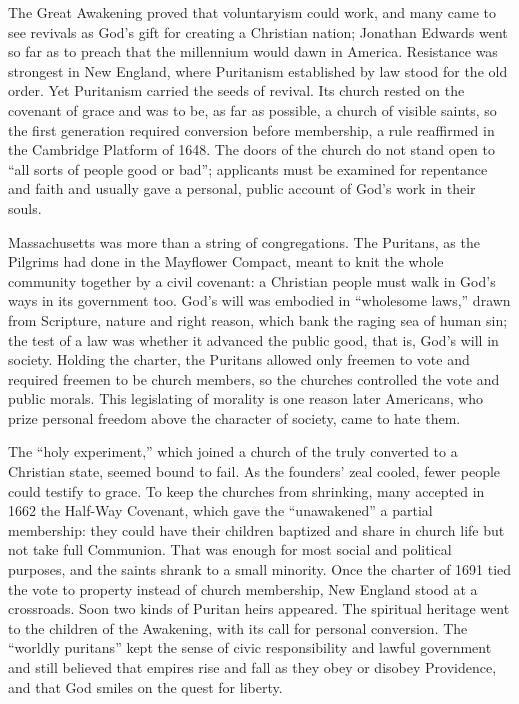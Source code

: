 The Great Awakening proved that voluntaryism could work, and many came to see revivals as God's gift
for creating a Christian nation; Jonathan Edwards went so far as to preach that the millennium would dawn in America. Resistance was strongest in New England, where Puritanism established by law stood
for the old order. Yet Puritanism carried the seeds of revival. Its church rested on the covenant of
grace and was to be, as far as possible, a church of visible saints, so the first generation required
conversion before membership, a rule reaffirmed in the Cambridge Platform of 1648. The doors of the
church do not stand open to ``all sorts of people good or bad''; applicants must be examined for
repentance and faith and usually gave a personal, public account of God's work in their souls.

Massachusetts was more than a string of congregations. The Puritans, as the Pilgrims had done in the Mayflower Compact, meant to knit the whole community together by a civil covenant: a Christian people must
walk in God's ways in its government too. God's will was embodied in ``wholesome laws,'' drawn from
Scripture, nature and right reason, which bank the raging sea of human sin; the test of a law was
whether it advanced the public good, that is, God's will in society. Holding the charter, the
Puritans allowed only freemen to vote and required freemen to be church members, so the churches
controlled the vote and public morals. This legislating of morality is one reason later Americans,
who prize personal freedom above the character of society, came to hate them.

The ``holy experiment,'' which joined a church of the truly converted to a Christian state, seemed
bound to fail. As the founders' zeal cooled, fewer people could testify to grace. To keep the
churches from shrinking, many accepted in 1662 the Half-Way Covenant, which gave the ``unawakened'' a
partial membership: they could have their children baptized and share in church life but not take
full Communion. That was enough for most social and political purposes, and the saints shrank to a
small minority. Once the charter of 1691 tied the vote to property instead of church membership,
New England stood at a crossroads. Soon two kinds of Puritan heirs appeared. The spiritual heritage
went to the children of the Awakening, with its call for personal conversion. The ``worldly
puritans'' kept the sense of civic responsibility and lawful government and still believed that
empires rise and fall as they obey or disobey Providence, and that God smiles on the quest for
liberty.

